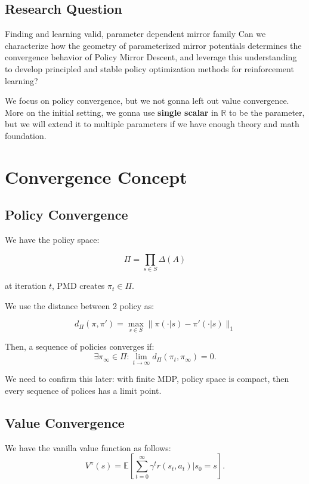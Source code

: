 \documentclass[11pt,a4paper]{article}
\begin{document}
\subsection{Research Question}
\begin{question}{Finding and learning valid, parameter dependent mirror family}
Can we characterize how the geometry of parameterized mirror potentials determines the convergence behavior of Policy Mirror Descent, and leverage this understanding to develop principled and stable policy optimization methods for reinforcement learning?
\end{question}

\begin{note}
We focus on policy convergence, but we not gonna left out value convergence. More on the initial setting, we gonna use \textbf{single scalar} in $\mathbb{R}$ to be the parameter, but we will extend it to multiple parameters if we have enough theory and math foundation.
\end{note}

\newpage

\section{Convergence Concept}
\subsection{Policy Convergence}
We have the policy space:

\[
\Pi = \prod_{s\in S}\Delta(A)
\]

at iteration $t$, PMD creates $\pi_t \in \Pi$.

We use the distance between 2 policy as:

\[
d_{\Pi}(\pi, \pi') = \max_{s\in S}\|\pi(\cdot|s) - \pi'(\cdot|s)\|_1
\]

Then, a sequence of policies converges if:
\[
\exists \pi_{\infty}\in \Pi: \lim_{t\rightarrow \infty} d_{\Pi}(\pi_t, \pi_{\infty}) = 0.
\]


\begin{note}
We need to confirm this later: with finite MDP, policy space is compact, then every sequence of polices has a limit point.
\end{note}

\subsection{Value Convergence}
We have the vanilla value function as follows:
\[
V^{\pi}(s) = \mathbb{E}[\sum^{\infty}_{t=0}\gamma^tr(s_t,a_t)|s_0=s].
\]
\end{document}

